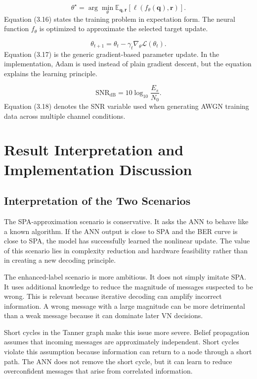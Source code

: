 \begin{equation}
\theta^{\star}=\arg\min_{\theta}\mathbb{E}_{\mathbf{q},\mathbf{r}}\left[\ell(f_{\theta}(\mathbf{q}),\mathbf{r})\right].
\end{equation}
Equation (3.16) states the training problem in expectation form. The neural function $f_\theta$ is optimized to approximate the selected target update.

\begin{equation}
\theta_{t+1}=\theta_t-\gamma_t\nabla_{\theta}\mathcal{L}(\theta_t).
\end{equation}
Equation (3.17) is the generic gradient-based parameter update. In the implementation, Adam is used instead of plain gradient descent, but the equation explains the learning principle.

\begin{equation}
\mathrm{SNR}_{\mathrm{dB}}=10\log_{10}\frac{E_s}{N_0}.
\end{equation}
Equation (3.18) denotes the SNR variable used when generating AWGN training data across multiple channel conditions.

\section{Result Interpretation and Implementation Discussion}
\subsection{Interpretation of the Two Scenarios}
The SPA-approximation scenario is conservative. It asks the ANN to behave like a known algorithm. If the ANN output is close to SPA and the BER curve is close to SPA, the model has successfully learned the nonlinear update. The value of this scenario lies in complexity reduction and hardware feasibility rather than in creating a new decoding principle.

The enhanced-label scenario is more ambitious. It does not simply imitate SPA. It uses additional knowledge to reduce the magnitude of messages suspected to be wrong. This is relevant because iterative decoding can amplify incorrect information. A wrong message with a large magnitude can be more detrimental than a weak message because it can dominate later VN decisions.

Short cycles in the Tanner graph make this issue more severe. Belief propagation assumes that incoming messages are approximately independent. Short cycles violate this assumption because information can return to a node through a short path. The ANN does not remove the short cycle, but it can learn to reduce overconfident messages that arise from correlated information.

